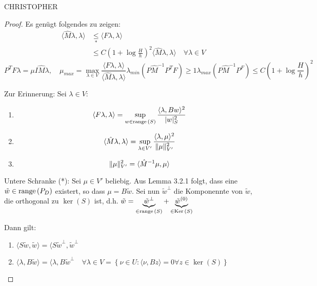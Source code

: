 CHRISTOPHER

\begin{proof}
  Es genügt folgendes zu zeigen: 
  \begin{align*}
    \langle \hat{M}\lambda,\lambda\rangle &\underset{*}{\leq} \langle F\lambda,\lambda\rangle\\
    &\leq C(1+\log \frac{H}{h})^2 \langle \hat{M}\lambda,\lambda\rangle \quad \forall \lambda\in V
  \end{align*}
  \[
    P^TF\lambda=\mu I\hat{M}\lambda, \quad 
    \mu_{max} = \max_{\lambda\in V} \frac{\langle F\lambda,\lambda\rangle}{\langle\hat{M}\lambda,\lambda\rangle}
    \lambda_{min}(P\hat{M}^{-1}P^TF) \geq 1
    \lambda_{max}(P\hat{M}^{-1}P^F) \leq C(1+\log \frac{H}{h})^2
  \]

  Zur Erinnerung: Sei $\lambda\in V$:
  \begin{enumerate}
      \item
        \[
          \langle F\lambda,\lambda\rangle = \sup_{w\in\textnormal{range}\,(S)} \frac{\langle\lambda,Bw\rangle^2}{|w|_S^2}
        \]
      \item
        \[
          \langle\hat{M}\lambda,\lambda\rangle = \sup_{\lambda\in V'} \frac{\langle\lambda,\mu\rangle^2}{\|\mu\|_{V'}^2}
        \]
      \item 
        \[
          \|\mu\|_{V'}^2 = \langle\hat{M}^{-1}\mu,\mu\rangle
        \]
  \end{enumerate}

  Untere Schranke (*): 
  Sei $\mu\in V'$ beliebig. Aus Lemma 3.2.1 folgt, dass eine $\tilde{w}\in\textnormal{range}\,(P_D)$ existert, so dass $\mu=B\tilde{w}$. Sei nun $\tilde{w}^{\perp}$ die Komponennte von $\tilde{w}$, die orthogonal zu $\ker(S)$ ist, d.h. $\tilde{w}=\underbrace{\tilde{w}^{\perp}}_{\in\textnormal{range}\,(S)} + \underbrace{\tilde{w}^{(0)}}_{\in\textnormal{Ker}\,(S)}$

  Dann gilt: 
  \begin{enumerate}
    \item $\langle S\tilde{w},\tilde{w}\rangle = \langle S\tilde{w}^{\perp},\tilde{w}^{\perp}$
    \item $\langle\lambda,B\tilde{w}\rangle = \langle\lambda,B\tilde{w}^{\perp} \quad \forall \lambda\in V = \left\{ \nu\in U: \langle\nu,Bz\rangle =0 \forall z\in\ker(S) \right\}$
  \end{enumerate}


\end{proof}
